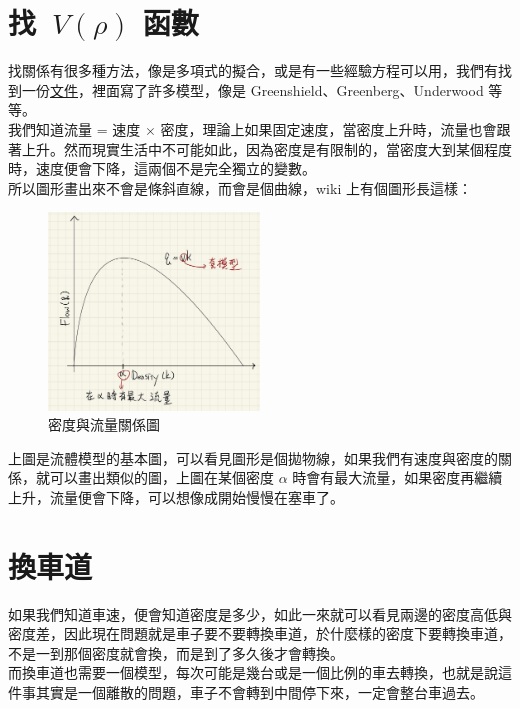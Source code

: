 \documentclass[a4paper,12pt]{report}
\begin{document}
\begin{CJK*}{UTF8}{bkai}
\section{找\ $V({\rho})$ 函數}

找關係有很多種方法，像是多項式的擬合，或是有一些經驗方程可以用，我們有找到一份\href{https://www.ceci.org.tw/Upload/Download/8B04AEBF-C160-477C-B6E3-63FA9A3BA096.pdf}{文件}，裡面寫了許多模型，像是 Greenshield、Greenberg、Underwood 等等。\\

我們知道流量 = 速度 $\times$ 密度，理論上如果固定速度，當密度上升時，流量也會跟著上升。然而現實生活中不可能如此，因為密度是有限制的，當密度大到某個程度時，速度便會下降，這兩個不是完全獨立的變數。\\

所以圖形畫出來不會是條斜直線，而會是個曲線，wiki 上有個圖形長這樣：

\begin{figure}[H] 
\centering 
\includegraphics[width=0.5\textwidth]{11-3} 
\caption{密度與流量關係圖}
\label{Fig.main2} 
\end{figure}

上圖是流體模型的基本圖，可以看見圖形是個拋物線，如果我們有速度與密度的關係，就可以畫出類似的圖，上圖在某個密度 $\alpha$ 時會有最大流量，如果密度再繼續上升，流量便會下降，可以想像成開始慢慢在塞車了。

\section{換車道}

如果我們知道車速，便會知道密度是多少，如此一來就可以看見兩邊的密度高低與密度差，因此現在問題就是車子要不要轉換車道，於什麼樣的密度下要轉換車道，不是一到那個密度就會換，而是到了多久後才會轉換。\\

而換車道也需要一個模型，每次可能是幾台或是一個比例的車去轉換，也就是說這件事其實是一個離散的問題，車子不會轉到中間停下來，一定會整台車過去。\\


\end{CJK*}
\end{document}
